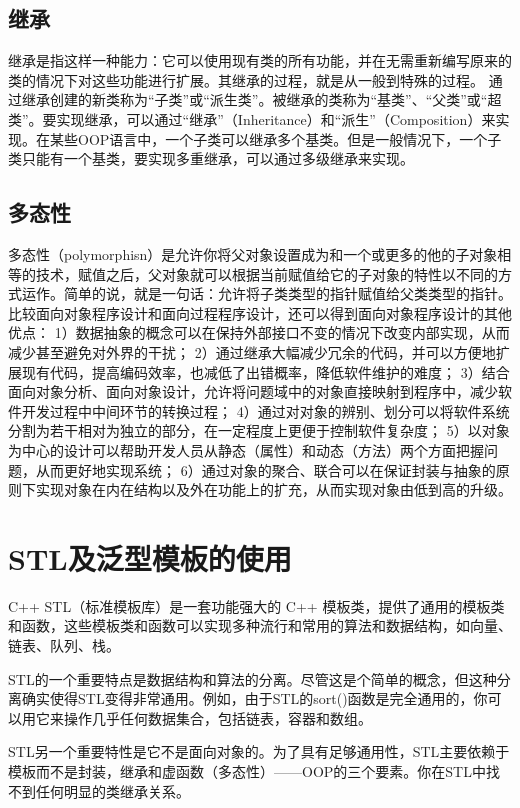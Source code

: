\subsection{继承}
继承是指这样一种能力：它可以使用现有类的所有功能，并在无需重新编写原来的类的情况下对这些功能进行扩展。其继承的过程，就是从一般到特殊的过程。
通过继承创建的新类称为“子类”或“派生类”。被继承的类称为“基类”、“父类”或“超类”。要实现继承，可以通过“继承”（Inheritance）和“派生”（Composition）来实现。在某些OOP语言中，一个子类可以继承多个基类。但是一般情况下，一个子类只能有一个基类，要实现多重继承，可以通过多级继承来实现。

\subsection{多态性}
多态性（polymorphisn）是允许你将父对象设置成为和一个或更多的他的子对象相等的技术，赋值之后，父对象就可以根据当前赋值给它的子对象的特性以不同的方式运作。简单的说，就是一句话：允许将子类类型的指针赋值给父类类型的指针。
比较面向对象程序设计和面向过程程序设计，还可以得到面向对象程序设计的其他优点：
1）数据抽象的概念可以在保持外部接口不变的情况下改变内部实现，从而减少甚至避免对外界的干扰；
2）通过继承大幅减少冗余的代码，并可以方便地扩展现有代码，提高编码效率，也减低了出错概率，降低软件维护的难度；
3）结合面向对象分析、面向对象设计，允许将问题域中的对象直接映射到程序中，减少软件开发过程中中间环节的转换过程；
4）通过对对象的辨别、划分可以将软件系统分割为若干相对为独立的部分，在一定程度上更便于控制软件复杂度；
5）以对象为中心的设计可以帮助开发人员从静态（属性）和动态（方法）两个方面把握问题，从而更好地实现系统；
6）通过对象的聚合、联合可以在保证封装与抽象的原则下实现对象在内在结构以及外在功能上的扩充，从而实现对象由低到高的升级。


\section{STL及泛型模板的使用}

C++ STL（标准模板库）是一套功能强大的 C++ 模板类，提供了通用的模板类和函数，这些模板类和函数可以实现多种流行和常用的算法和数据结构，如向量、链表、队列、栈。

STL的一个重要特点是数据结构和算法的分离。尽管这是个简单的概念，但这种分离确实使得STL变得非常通用。例如，由于STL的sort()函数是完全通用的，你可以用它来操作几乎任何数据集合，包括链表，容器和数组。

STL另一个重要特性是它不是面向对象的。为了具有足够通用性，STL主要依赖于模板而不是封装，继承和虚函数（多态性）——OOP的三个要素。你在STL中找不到任何明显的类继承关系。

